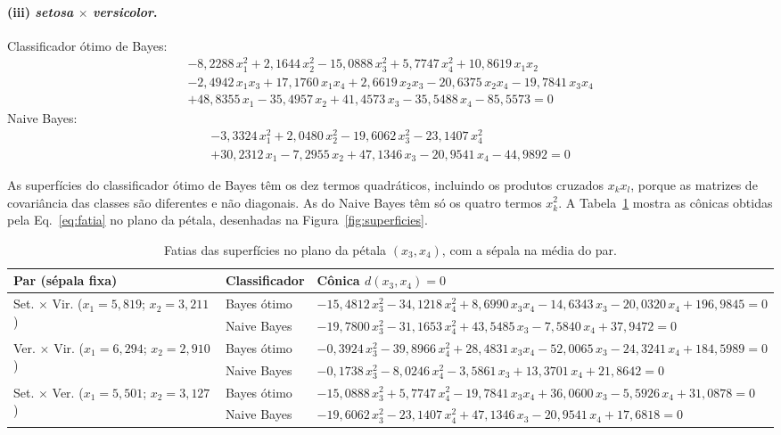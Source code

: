 \documentclass[12pt,a4paper]{article}
\newcommand{\setosa}{\emph{setosa}}
\newcommand{\versicolor}{\emph{versicolor}}
\begin{document}
\paragraph{(iii) \setosa{} $\times$ \versicolor{}.} Classificador ótimo de Bayes:
{\small
\begin{multline*}
 - 8{,}2288\,x_1^2 + 2{,}1644\,x_2^2 - 15{,}0888\,x_3^2 + 5{,}7747\,x_4^2 + 10{,}8619\,x_1x_2 \\
 - 2{,}4942\,x_1x_3 + 17{,}1760\,x_1x_4 + 2{,}6619\,x_2x_3 - 20{,}6375\,x_2x_4 - 19{,}7841\,x_3x_4 \\
 + 48{,}8355\,x_1 - 35{,}4957\,x_2 + 41{,}4573\,x_3 - 35{,}5488\,x_4 - 85{,}5573 = 0
\end{multline*}}
Naive Bayes:
{\small
\begin{multline*}
 - 3{,}3324\,x_1^2 + 2{,}0480\,x_2^2 - 19{,}6062\,x_3^2 - 23{,}1407\,x_4^2 \\
 + 30{,}2312\,x_1 - 7{,}2955\,x_2 + 47{,}1346\,x_3 - 20{,}9541\,x_4 - 44{,}9892 = 0
\end{multline*}}

As superfícies do classificador ótimo de Bayes têm os dez termos quadráticos, incluindo os produtos cruzados $x_kx_l$, porque as matrizes de covariância das classes são diferentes e não diagonais. As do Naive Bayes têm só os quatro termos $x_k^2$. A Tabela~\ref{tab:fatias} mostra as cônicas obtidas pela Eq.~\eqref{eq:fatia} no plano da pétala, desenhadas na Figura~\ref{fig:superficies}.

\begin{table}[H]
\centering
\caption{Fatias das superfícies no plano da pétala $(x_3, x_4)$, com a sépala na média do par.}
\label{tab:fatias}
\footnotesize
\begin{tabular}{llp{9.3cm}}
\toprule
Par (sépala fixa) & Classificador & Cônica $d(x_3, x_4) = 0$ \\
\midrule
\multirow{2}{2.8cm}{Set. $\times$ Vir. ($x_1 = 5{,}819$; $x_2 = 3{,}211$)}
 & Bayes ótimo & $-15{,}4812\,x_3^2 - 34{,}1218\,x_4^2 + 8{,}6990\,x_3x_4 - 14{,}6343\,x_3 - 20{,}0320\,x_4 + 196{,}9845 = 0$ \\
 & Naive Bayes & $-19{,}7800\,x_3^2 - 31{,}1653\,x_4^2 + 43{,}5485\,x_3 - 7{,}5840\,x_4 + 37{,}9472 = 0$ \\
\midrule
\multirow{2}{2.8cm}{Ver. $\times$ Vir. ($x_1 = 6{,}294$; $x_2 = 2{,}910$)}
 & Bayes ótimo & $-0{,}3924\,x_3^2 - 39{,}8966\,x_4^2 + 28{,}4831\,x_3x_4 - 52{,}0065\,x_3 - 24{,}3241\,x_4 + 184{,}5989 = 0$ \\
 & Naive Bayes & $-0{,}1738\,x_3^2 - 8{,}0246\,x_4^2 - 3{,}5861\,x_3 + 13{,}3701\,x_4 + 21{,}8642 = 0$ \\
\midrule
\multirow{2}{2.8cm}{Set. $\times$ Ver. ($x_1 = 5{,}501$; $x_2 = 3{,}127$)}
 & Bayes ótimo & $-15{,}0888\,x_3^2 + 5{,}7747\,x_4^2 - 19{,}7841\,x_3x_4 + 36{,}0600\,x_3 - 5{,}5926\,x_4 + 31{,}0878 = 0$ \\
 & Naive Bayes & $-19{,}6062\,x_3^2 - 23{,}1407\,x_4^2 + 47{,}1346\,x_3 - 20{,}9541\,x_4 + 17{,}6818 = 0$ \\
\bottomrule
\end{tabular}
\end{table}
\end{document}
